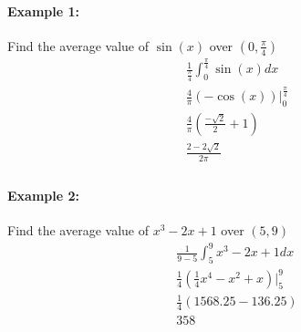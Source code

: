 \documentclass[../revisedmain.tex]{subfiles}
\begin{document}
	\paragraph{Example 1:} Find the average value of $\sin(x)$ over $(0,\frac{\pi}{4})$
	\begin{gather*}
		\frac{1}{\frac{\pi}{4}}\int_{0}^{\frac{\pi}{4}}\sin(x)dx\\
		\frac{4}{\pi}(-\cos(x))\Big|_{0}^{\frac{\pi}{4}}\\
		\frac{4}{\pi}(\frac{-\sqrt{2}}{2}+1)\\
		\frac{2-2\sqrt{2}}{2\pi}\\
	\end{gather*}
	\paragraph{Example 2:} Find the average value of $x^3-2x+1$ over $(5,9)$
	\begin{gather*}
		\frac{1}{9-5}\int_{5}^{9}x^3-2x+1dx\\
		\frac{1}{4}(\frac{1}{4}x^4-x^2+x)\Big|_{5}^{9}\\
		\frac{1}{4}(1568.25-136.25)\\
		358\\
	\end{gather*}
\end{document}
